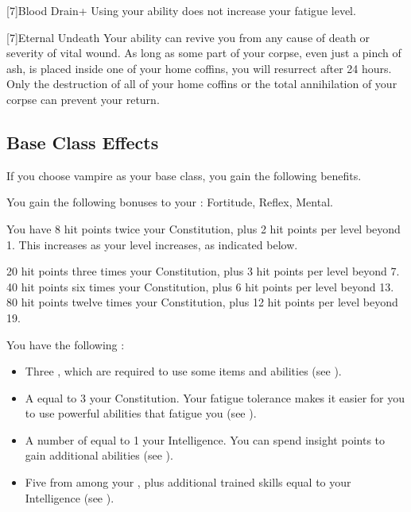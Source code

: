         [7]{Blood Drain+} Using your  ability does not increase your fatigue level.

        [7]{Eternal Undeath} Your  ability can revive you from any cause of death or severity of vital wound.
        As long as some part of your corpse, even just a pinch of ash, is placed inside one of your home coffins, you will resurrect after 24 hours.
        Only the destruction of all of your home coffins or the total annihilation of your corpse can prevent your return.

    \subsection{Base Class Effects}
        If you choose vampire as your base class, you gain the following benefits.

        You gain the following bonuses to your :  Fortitude,  Reflex,  Mental.

            You have 8 hit points \add twice your Constitution, plus 2 hit points per level beyond 1.
            This increases as your level increases, as indicated below.
            \begin{itemize}
                 20 hit points \add three times your Constitution, plus 3 hit points per level beyond 7.
                 40 hit points \add six times your Constitution, plus 6 hit points per level beyond 13.
                 80 hit points \add twelve times your Constitution, plus 12 hit points per level beyond 19.
            \end{itemize}

         You have the following :
        \begin{itemize}
            \item Three , which are required to use some items and abilities (see ).
            \item A  equal to 3 \add your Constitution.
                Your fatigue tolerance makes it easier for you to use powerful abilities that fatigue you (see ).
            \item A number of  equal to 1 \add your Intelligence.
                You can spend insight points to gain additional abilities (see ).
            \item Five  from among your , plus additional trained skills equal to your Intelligence (see ).
        \end{itemize}

